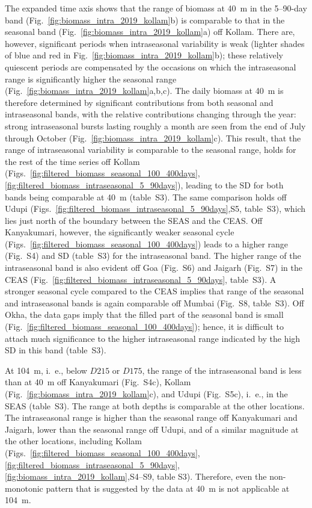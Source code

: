 \documentclass[authoryear,review,11pt]{elsarticle}
\begin{document}
The expanded time axis shows that the range of biomass at 40~m in the 5--90-day band (Fig.~\ref{fig:biomass_intra_2019_kollam}b) is comparable to that in the seasonal band (Fig.~\ref{fig:biomass_intra_2019_kollam}a) off Kollam.  There are, however, significant periods when intraseasonal variability is weak (lighter shades of blue and red in Fig.~\ref{fig:biomass_intra_2019_kollam}b); these relatively quiescent periods are compensated by the occasions on which the intraseasonal range is significantly higher the seasonal range (Fig.~\ref{fig:biomass_intra_2019_kollam}a,b,c). The daily biomass at 40~m is therefore determined by significant contributions from both seasonal and intraseasonal bands, with the relative contributions changing through the year: strong intraseasonal bursts lasting roughly a month are seen from the end of July through October (Fig.~\ref{fig:biomass_intra_2019_kollam}c). This result, that the range of intraseasonal variability is comparable to the seasonal range, holds for the rest of the time series off Kollam (Figs.~\ref{fig:filtered_biomass_seasonal_100_400days},\ref{fig:filtered_biomass_intraseasonal_5_90days}), leading to the SD for both bands being comparable at 40~m (table~S3).  The same comparison holds off Udupi (Figs.~\ref{fig:filtered_biomass_intraseasonal_5_90days},S5, table~S3), which lies just north of the boundary between the SEAS and the CEAS.  Off Kanyakumari, however, the significantly weaker seasonal cycle (Figs.~\ref{fig:filtered_biomass_seasonal_100_400days}) leads to a higher range (Fig.~S4) and SD (table~S3) for the intraseasonal band.  The higher range of the intraseasonal band is also evident off Goa (Fig.~S6) and Jaigarh (Fig.~S7) in the CEAS (Fig.~\ref{fig:filtered_biomass_intraseasonal_5_90days}, table~S3). A stronger seasonal cycle compared to the CEAS implies that range of the seasonal and intraseasonal bands is again comparable off Mumbai (Fig.~S8, table~S3).  Off Okha, the data gaps imply that the filled part of the seasonal band is small (Fig.~\ref{fig:filtered_biomass_seasonal_100_400days}); hence, it is difficult to attach much significance to the higher intraseasonal range indicated by the high SD in this band (table~S3).

At 104~m, i.~e., below $D215$ or $D175$, the range of the intraseasonal band is less than at 40~m off Kanyakumari (Fig.~S4c), Kollam (Fig.~\ref{fig:biomass_intra_2019_kollam}c), and Udupi (Fig.~S5c), i.~e., in the SEAS (table~S3).  The range at both depths is comparable at the other locations. The intraseasonal range is higher than the seasonal range off Kanyakumari and Jaigarh, lower than the seasonal range off Udupi, and of a similar magnitude at the other locations, including Kollam (Figs.~\ref{fig:filtered_biomass_seasonal_100_400days},\ref{fig:filtered_biomass_intraseasonal_5_90days},\ref{fig:biomass_intra_2019_kollam},S4--S9, table S3). Therefore, even the non-monotonic pattern that is suggested by the data at 40~m is not applicable at 104~m.
\end{document}
